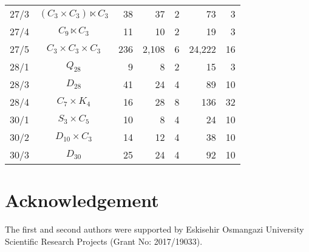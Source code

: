\documentclass[a4paper,11pt]{article}
\theoremstyle{plain}
\theoremstyle{definition}
\begin{document}
\begin{longtable}{ccrrrrr}
	27/3 & $(C_3 \times C_3) \ltimes C_3$ & 38 & 37 & 2 & 73 & 3 \\ 
	27/4 & $C_9 \ltimes C_3$ & 11 & 10 & 2 & 19 & 3 \\ 
	27/5 & $C_3 \times C_3 \times C_3$ & 236 & 2,108 & 6 & 24,222  & 16 \\ 
	28/1 & $Q_{28}$ & 9 & 8 & 2 & 15 & 3 \\ 
	28/3 & $D_{28}$ & 41 & 24 & 4 & 89 & 10 \\ 
	28/4 & $C_7 \times K_4$ & 16 & 28 & 8 & 136 & 32 \\ 
	30/1 & $S_3 \times C_5$ & 10 & 8 & 4 & 24 & 10 \\ 
	30/2 & $D_{10} \times C_3$ & 14 & 12 & 4 & 38 & 10 \\ 
	30/3 & $D_{30}$ & 25 & 24 & 4 & 92 & 10 \\ 
	\hline
\end{longtable}


\section*{Acknowledgement}

The first and second authors were supported by Eskisehir Osmangazi
University Scientific Research Projects (Grant No: 2017/19033).
\end{document}
